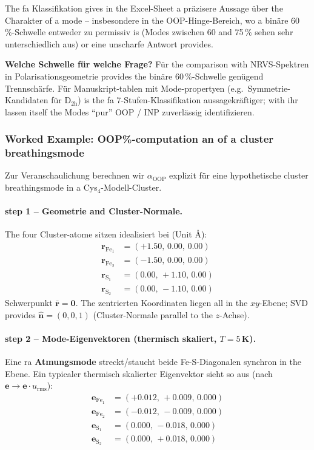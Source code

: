 \documentclass[11pt,a4paper,twoside]{article}
\providecommand{\angstrom}{\text{\AA}}    %
\newcommand{\OOP}{\mathrm{OOP}}
\theoremstyle{remark}
\begin{document}
The fa Klassifikation gives in the Excel-Sheet a pr\"azisere Aussage
\"uber the Charakter of a mode -- insbesondere in the OOP-Hinge-Bereich,
wo a bin\"are 60\,\%-Schwelle entweder zu permissiv is (Modes
zwischen 60 and 75\,\% sehen sehr unterschiedlich aus) or eine
unscharfe Antwort provides.

\begin{infobox}
\textbf{Welche Schwelle f\"ur welche Frage?} F\"ur the comparison with
NRVS-Spektren in Polarisationsgeometrie provides the bin\"are 60\,\%-Schwelle
gen\"ugend Trennsch\"arfe. F\"ur Manuskript-tablen mit
Mode-propertyen (e.g.\ Symmetrie-Kandidaten f\"ur D$_\mathrm{2h}$)
is the fa 7-Stufen-Klassifikation aussagekr\"aftiger; with ihr
lassen itself the Modes "`pur"' OOP / INP zuverl\"assig identifizieren.
\end{infobox}

\subsubsection*{Worked Example: OOP\%-computation an of a cluster breathingsmode}

Zur Veranschaulichung berechnen wir $\alpha_{\OOP}$ explizit f\"ur eine
hypothetische cluster breathingsmode in a Cys$_4$-Modell-Cluster.

\paragraph{step 1 -- Geometrie and Cluster-Normale.}
The four Cluster-atome sitzen idealisiert bei (Unit $\angstrom$):
\begin{align*}
  \mathbf{r}_{\text{Fe}_1} &= (+1.50,\, 0.00,\, 0.00) \\
  \mathbf{r}_{\text{Fe}_2} &= (-1.50,\, 0.00,\, 0.00) \\
  \mathbf{r}_{\text{S}_1}  &= ( 0.00,\, +1.10,\, 0.00) \\
  \mathbf{r}_{\text{S}_2}  &= ( 0.00,\, -1.10,\, 0.00)
\end{align*}
Schwerpunkt $\bar{\mathbf{r}} = \mathbf{0}$. The zentrierten Koordinaten
liegen all in the $xy$-Ebene; SVD provides
$\hat{\mathbf{n}} = (0, 0, 1)$ (Cluster-Normale parallel to the $z$-Achse).

\paragraph{step 2 -- Mode-Eigenvektoren (thermisch skaliert, $T=5$\,K).}
Eine ra \textbf{Atmungsmode} streckt/staucht beide Fe-S-Diagonalen
synchron in the Ebene. Ein typicaler thermisch skalierter Eigenvektor
sieht so aus (nach $\mathbf{e} \to \mathbf{e}\cdot u_\text{rms}$):
\begin{align*}
  \mathbf{e}_{\text{Fe}_1} &= (+0.012,\, +0.009,\, 0.000) \\
  \mathbf{e}_{\text{Fe}_2} &= (-0.012,\, -0.009,\, 0.000) \\
  \mathbf{e}_{\text{S}_1}  &= ( 0.000,\, -0.018,\, 0.000) \\
  \mathbf{e}_{\text{S}_2}  &= ( 0.000,\, +0.018,\, 0.000)
\end{align*}
\end{document}
